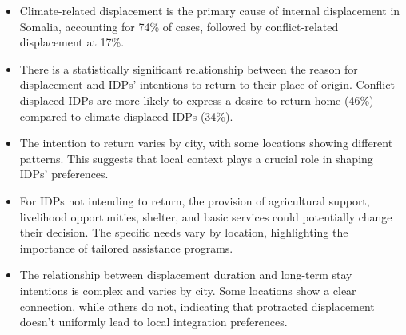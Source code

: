 \documentclass[
]{article}
\providecommand{\tightlist}{%
  \setlength{\itemsep}{0pt}\setlength{\parskip}{0pt}}
\begin{document}
\begin{itemize}
\tightlist
\item
  Climate-related displacement is the primary cause of internal
  displacement in Somalia, accounting for 74\% of cases, followed by
  conflict-related displacement at 17\%.
\item
  There is a statistically significant relationship between the reason
  for displacement and IDPs' intentions to return to their place of
  origin. Conflict-displaced IDPs are more likely to express a desire to
  return home (46\%) compared to climate-displaced IDPs (34\%).
\item
  The intention to return varies by city, with some locations showing
  different patterns. This suggests that local context plays a crucial
  role in shaping IDPs' preferences.
\item
  For IDPs not intending to return, the provision of agricultural
  support, livelihood opportunities, shelter, and basic services could
  potentially change their decision. The specific needs vary by
  location, highlighting the importance of tailored assistance programs.
\item
  The relationship between displacement duration and long-term stay
  intentions is complex and varies by city. Some locations show a clear
  connection, while others do not, indicating that protracted
  displacement doesn't uniformly lead to local integration preferences.
\end{itemize}
\end{document}
